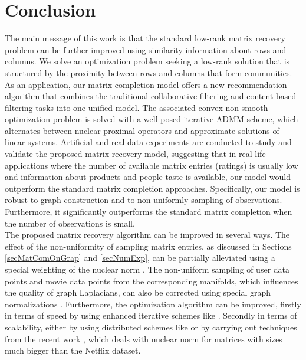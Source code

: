 \documentclass{article}
\begin{document}
\section{Conclusion}
\label{secCon}
\vspace{-0.15cm}
The main message of this work is that the standard low-rank matrix recovery problem can be further improved using similarity information about rows and columns. We solve an optimization problem seeking a low-rank solution that is structured by the proximity between rows and columns that form communities. As an application, our matrix completion model offers a new recommendation algorithm that combines the traditional collaborative filtering and content-based filtering tasks into one unified model. The associated convex non-smooth optimization problem is solved with a well-posed iterative ADMM scheme, which alternates between nuclear proximal operators and approximate solutions of linear systems. Artificial and real data experiments are conducted to study and validate the proposed matrix recovery model, suggesting that in real-life applications where the number of available matrix entries (ratings) is usually low and information about products and people taste is available, our model would outperform the standard matrix completion approaches. 
%
Specifically, our model is robust to graph construction and to non-uniformly sampling of observations. Furthermore, it significantly outperforms the standard matrix completion when the number of observations is small. \\
The proposed matrix recovery algorithm can be improved in several ways. The effect of the non-uniformity of sampling matrix entries, as discussed in Sections \ref{secMatComOnGrap} and \ref{secNumExp}, can be partially alleviated using a special weighting of the nuclear norm \cite{salakhutdinov2010collaborative}. The non-uniform sampling of user data points and movie data points from the corresponding manifolds, which influences the quality of graph Laplacians, can also be corrected using special graph normalizations \cite{art:CoifmanLafon06DifMap}. Furthermore, the optimization algorithm can be improved, firstly in terms of speed by using enhanced iterative schemes like \cite{nesterov2013first}. Secondly in terms of scalability, either by using distributed schemes like \cite{mardani2012distributed} or %
 by carrying out techniques from the recent work \cite{hsieh2014nuclear}, which deals with nuclear norm for matrices with sizes much bigger than the Netflix dataset. 









 \denserrlistbib



%

%
\end{document}
